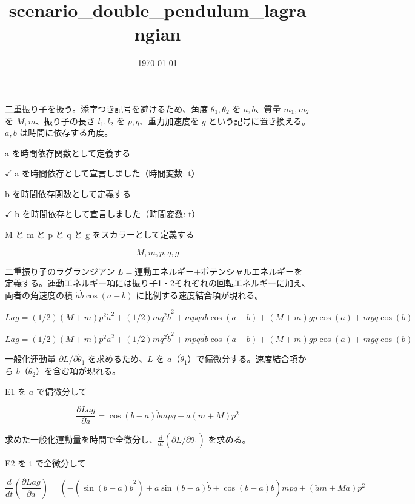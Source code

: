 \documentclass[dvipdfmx,a4paper,11pt]{jsarticle}
\title{scenario\_double\_pendulum\_lagrangian}
\date{\today}
\begin{document}
\maketitle

二重振り子を扱う。添字つき記号を避けるため、角度 $\theta_1,\theta_2$ を $a,b$、質量 $m_1,m_2$ を $M,m$、振り子の長さ $l_1,l_2$ を $p,q$、重力加速度を $g$ という記号に置き換える。$a,b$ は時間に依存する角度。

a を時間依存関数として定義する

$\checkmark$ a を時間依存として宣言しました（時間変数: t）

b を時間依存関数として定義する

$\checkmark$ b を時間依存として宣言しました（時間変数: t）

M と m と p と q と g をスカラーとして定義する

\[
  M, m, p, q, g
\]

二重振り子のラグランジアン $L=$運動エネルギー$+$ポテンシャルエネルギーを定義する。運動エネルギー項には振り子1・2それぞれの回転エネルギーに加え、両者の角速度の積 $\dot a\dot b\cos(a-b)$ に比例する速度結合項が現れる。

$Lag = (1/2) (M + m) p^2 \dot{a}^2 + (1/2) m q^2 \dot{b}^2 + m p q \dot{a} \dot{b} \cos(a - b) + (M + m) g p \cos(a) + m g q \cos(b)$

\begin{equation}
  Lag = (1/2) (M + m) p^2 \dot{a}^2 + (1/2) m q^2 \dot{b}^2 + m p q \dot{a} \dot{b} \cos(a - b) + (M + m) g p \cos(a) + m g q \cos(b)
  \label{eq:E1}
\end{equation}

一般化運動量 $\partial L/\partial\dot\theta_1$ を求めるため、$L$ を $\dot a$（$\dot\theta_1$）で偏微分する。速度結合項から $\dot b$（$\dot\theta_2$）を含む項が現れる。

E1 を $\dot{a}$ で偏微分して

\begin{equation}
  \frac{\partial Lag}{\partial \dot{a}} = \cos \left(b-a\right) \dot{b} m p q+\dot{a} \left(m+M\right) p^2
  \label{eq:E2}
\end{equation}

求めた一般化運動量を時間で全微分し、$\frac{d}{dt}(\partial L/\partial\dot\theta_1)$ を求める。

E2 を t で全微分して

\begin{equation}
  \frac{d}{dt}\left(\frac{\partial Lag}{\partial \dot{a}}\right) = \left(-\left(\sin \left(b-a\right) \dot{b}^2\right)+\dot{a} \sin \left(b-a\right) \dot{b}+\cos \left(b-a\right) \ddot{b}\right) m p q+\left(\ddot{a} m+M \ddot{a}\right) p^2
  \label{eq:E3}
\end{equation}
\end{document}
